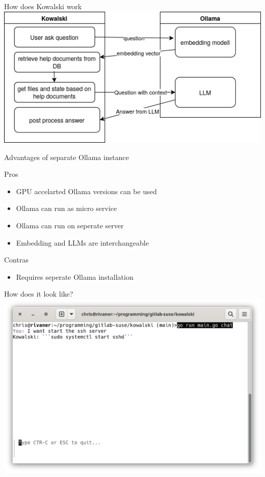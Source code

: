 \documentclass[aspectratio=169]{beamer}
\begin{document}
\begin{frame}{How does Kowalski work}
\includegraphics[width=\linewidth]{Flow.drawio}
\end{frame}

\begin{frame}{Advantages of separate Ollama instance}
\begin{block}{Pros}
\begin{itemize}
  \item GPU accelarted Ollama versions can be used
  \item Ollama can run as micro service
  \item Ollama can run on seperate server
  \item Embedding and LLMs are interchangeable
\end{itemize}
\end{block}
\begin{block}{Contras}
\begin{itemize}
  \item Requires seperate Ollama installation
\end{itemize}
\end{block}
\end{frame}

\begin{frame}{How does it look like?}
\includegraphics[width=.8\linewidth]{Startsshd.png}
\end{frame}
\end{document}
